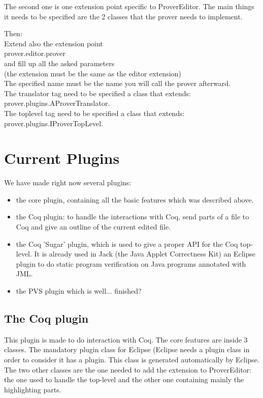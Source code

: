 \documentclass{entcs}
\begin{document}
The second one is one extension point specific to ProverEditor.
The main things it needs to be specified are the 2 classes that the prover
needs to implement.

Then:\\
Extend also the extension point\\
prover.editor.prover\\
and fill up all the asked parameters\\
(the extension must be the same as the editor extension)\\
The specified name must be the name you will call the prover afterward.\\
The translator tag need to be specified a class that extends:\\
prover.plugins.AProverTranslator.\\
The toplevel tag need to be specified a class that extends:\\
prover.plugins.IProverTopLevel.\\




\section{Current Plugins}

We have made right now several plugins:
\begin{itemize}
\item the core plugin, containing all the basic features which was described above.
\item the Coq plugin: to handle the interactions with Coq, send parts of a file to Coq
and give an outline of the current edited file.
\item the Coq 'Sugar' plugin, which is used to give a proper API for the Coq top-level.
It is already used in Jack \cite{Jack-Web} (the Java Applet Correctness Kit) an Eclipse plugin
to do static program verification on Java programs annotated with JML.

\item the PVS plugin which is well... finished?
\end{itemize}
\subsection{The Coq plugin}
This plugin is made to do interaction with Coq. The core features
are inside 3 classes. The mandatory plugin class for Eclipse (Eclipse
needs a plugin class in order to consider it has a plugin. This class
is generated automatically by Eclipse. The two other classes are the one
needed to add the extension to ProverEditor: the one used to handle the
top-level and the other one containing mainly the highlighting parts.
\end{document}
